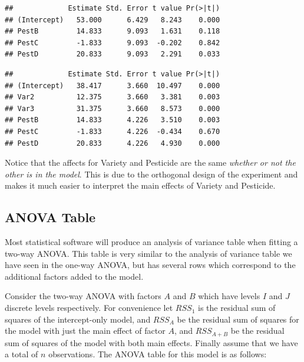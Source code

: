 \documentclass[]{book}
\newenvironment{Shaded}{\begin{snugshade}}{\end{snugshade}}
\newcommand{\KeywordTok}[1]{\textcolor[rgb]{0.13,0.29,0.53}{\textbf{{#1}}}}
\newcommand{\DataTypeTok}[1]{\textcolor[rgb]{0.13,0.29,0.53}{{#1}}}
\newcommand{\DecValTok}[1]{\textcolor[rgb]{0.00,0.00,0.81}{{#1}}}
\newcommand{\StringTok}[1]{\textcolor[rgb]{0.31,0.60,0.02}{{#1}}}
\newcommand{\NormalTok}[1]{{#1}}
\theoremstyle{definition}
\theoremstyle{definition}
\theoremstyle{remark}
\begin{document}
\begin{verbatim}
##             Estimate Std. Error t value Pr(>|t|)
## (Intercept)   53.000      6.429   8.243    0.000
## PestB         14.833      9.093   1.631    0.118
## PestC         -1.833      9.093  -0.202    0.842
## PestD         20.833      9.093   2.291    0.033
\end{verbatim}

\begin{Shaded}
\end{Shaded}

\begin{verbatim}
##             Estimate Std. Error t value Pr(>|t|)
## (Intercept)   38.417      3.660  10.497    0.000
## Var2          12.375      3.660   3.381    0.003
## Var3          31.375      3.660   8.573    0.000
## PestB         14.833      4.226   3.510    0.003
## PestC         -1.833      4.226  -0.434    0.670
## PestD         20.833      4.226   4.930    0.000
\end{verbatim}

Notice that the affects for Variety and Pesticide are the same
\emph{whether or not the other is in the model}. This is due to the
orthogonal design of the experiment and makes it much easier to
interpret the main effects of Variety and Pesticide.

\subsection{ANOVA Table}\label{anova-table}

Most statistical software will produce an analysis of variance table
when fitting a two-way ANOVA. This table is very similar to the analysis
of variance table we have seen in the one-way ANOVA, but has several
rows which correspond to the additional factors added to the model.

Consider the two-way ANOVA with factors \(A\) and \(B\) which have
levels \(I\) and \(J\) discrete levels respectively. For convenience let
\(RSS_{1}\) is the residual sum of squares of the intercept-only model,
and \(RSS_{A}\) be the residual sum of squares for the model with just
the main effect of factor \(A\), and \(RSS_{A+B}\) be the residual sum
of squares of the model with both main effects. Finally assume that we
have a total of \(n\) observations. The ANOVA table for this model is as
follows:
\end{document}
